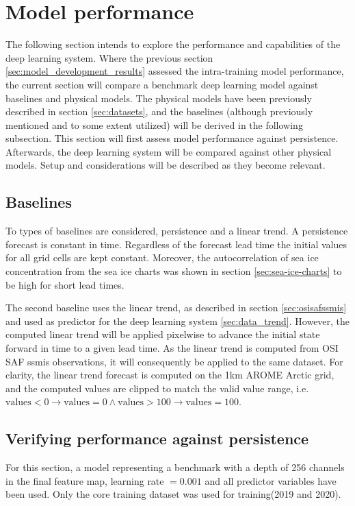 \documentclass[../main/thesis.tex]{subfiles}
\begin{document}
\section{Model performance}
The following section intends to explore the performance and capabilities of the deep learning system. Where the previous section \ref{sec:model_development_results} assessed the intra-training model performance, the current section will compare a benchmark deep learning model against baselines and physical models. The physical models have been previously described in section \ref{sec:datasets}, and the baselines (although previously mentioned and to some extent utilized) will be derived in the following subsection. This section will first assess model performance against persistence. Afterwards, the deep learning system will be compared against other physical models. Setup and considerations will be described as they become relevant.

\subsection{Baselines}
\label{sec:baselines}
To types of baselines are considered, persistence and a linear trend. A persistence forecast is constant in time. Regardless of the forecast lead time the initial values for all grid cells are kept constant. Moreover, the autocorrelation of sea ice concentration from the sea ice charts was shown in section \ref{sec:sea-ice-charts} to be high for short lead times. 


The second baseline uses the linear trend, as described in section \ref{sec:osisafssmis} and used as predictor for the deep learning system \ref{sec:data_trend}. However, the computed linear trend will be applied pixelwise to advance the initial state forward in time to a given lead time. As the linear trend is computed from OSI SAF ssmis observations, it will consequently be applied to the same dataset. For clarity, the linear trend forecast is computed on the 1km AROME Arctic grid, and the computed values are clipped to match the valid value range, i.e. $\text{values} < 0 \rightarrow \text{values} = 0 \land \text{values} > 100 \rightarrow \text{values} = 100$.


\subsection{Verifying performance against persistence}
For this section, a model representing a benchmark with a depth of 256 channels in the final feature map, learning rate $=0.001$ and all predictor variables have been used. Only the core training dataset was used for training(2019 and 2020).
\end{document}
